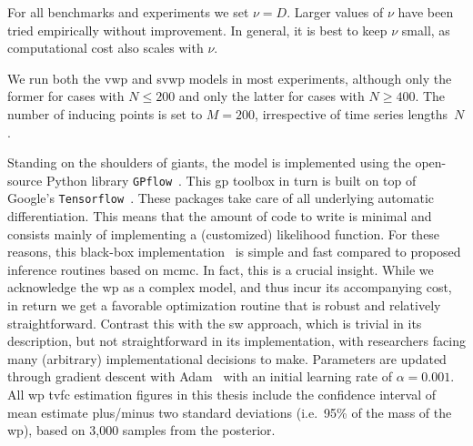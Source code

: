 For all benchmarks and experiments we set $\nu = D$.
Larger values of $\nu$ have been tried empirically without improvement.
In general, it is best to keep $\nu$ small, as computational cost also scales with $\nu$.

We run both the \gls{vwp} and \gls{svwp} models in most experiments, although only the former for cases with $N \leq 200$ and only the latter for cases with $N \geq 400$.
The number of inducing points is set to $M = 200$, irrespective of time series lengths~$N$.

Standing on the shoulders of giants, the model is implemented using the open-source Python library \texttt{GPflow}~\parencite[][version 2.6.4]{Matthews2017, Wilk2020}.
This \gls{gp} toolbox in turn is built on top of Google's \texttt{Tensorflow}~\parencite[][version 2.11.0]{Tensorflow2015}.
These packages take care of all underlying automatic differentiation.
This means that the amount of code to write is minimal and consists mainly of implementing a (customized) likelihood function.
For these reasons, this black-box implementation~\parencite{Ranganath2014} is simple and fast compared to proposed inference routines based on \gls{mcmc}.
%
In fact, this is a crucial insight.
While we acknowledge the \gls{wp} as a complex model, and thus incur its accompanying cost, in return we get a favorable optimization routine that is robust and relatively straightforward.
Contrast this with the \gls{sw} approach, which is trivial in its description, but not straightforward in its implementation, with researchers facing many (arbitrary) implementational decisions to make.
Parameters are updated through gradient descent with Adam~\parencite{Kingma2015} with an initial learning rate of $\alpha = 0.001$.
All \gls{wp} \gls{tvfc} estimation figures in this thesis include the confidence interval of mean estimate plus/minus two standard deviations (i.e.~95\% of the mass of the \gls{wp}), based on 3,000 samples from the posterior.
